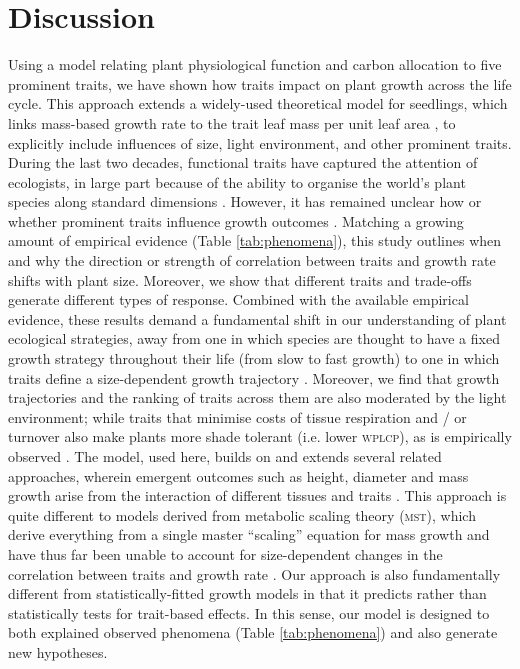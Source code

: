 \documentclass[a4paper,11pt]{article}
\begin{document}
\section{Discussion}

Using a model relating plant physiological function and carbon allocation to five prominent traits, we have shown how traits impact on plant growth across the life cycle. This approach extends a widely-used theoretical model for seedlings, which links mass-based growth rate to the trait leaf mass per unit leaf area \citep{Lambers-1992, Wright-2000}, to explicitly include influences of size, light environment, and other prominent traits. During the last two decades, functional traits have captured the attention of ecologists, in large part because of the ability to organise the world's plant species along standard dimensions \citep{Westoby-2002}. However, it has remained unclear how or whether prominent traits influence growth outcomes \citep{Poorter-2008, Wright-2010,Paine-2015}. Matching a growing amount of empirical evidence (Table \ref{tab:phenomena}), this study outlines when and why the direction or strength of correlation between traits and growth rate shifts with plant size. Moreover, we show that different traits and trade-offs generate different types of response. Combined with the available empirical evidence, these results demand a fundamental shift in our understanding of plant ecological strategies, away from one in which species are thought to have a fixed growth strategy throughout their life (from slow to fast growth) \citep[e.g.][]{Grime-1977, Adler-2014, Paine-2015} to one in which traits define a size-dependent growth trajectory \citep{Gibert-2016}. Moreover, we find that growth trajectories and the ranking of traits across them are also moderated by the light environment; while traits that minimise costs of tissue respiration and / or turnover also make plants more shade tolerant (i.e. lower \textsc{wplcp}), as is empirically observed \citep{Messier-1999, Craine-2005, Poorter-2006, Baltzer-2007, Lusk-2008}. The {\plant} model, used here, builds on and extends several related approaches, wherein emergent outcomes such as height, diameter and mass growth arise from the interaction of different tissues and traits \citep[e.g.][]{Givnish-1988, Makela-1997, Moorcroft-2001}. This approach is quite different to models derived from metabolic scaling theory (\textsc{mst}), which derive everything from a single master ``scaling'' equation for mass growth and have thus far been unable to account for size-dependent changes in the correlation between traits and growth rate \citep{Enquist-1999, Enquist-2007}. Our approach is also fundamentally different from statistically-fitted growth models \citep[e.g.][]{Herault-2011, Ruger-2012, Iida-2014} in that it predicts rather than statistically tests for trait-based effects. In this sense, our model is designed to both explained observed phenomena (Table \ref{tab:phenomena}) and also generate new hypotheses.
\end{document}
